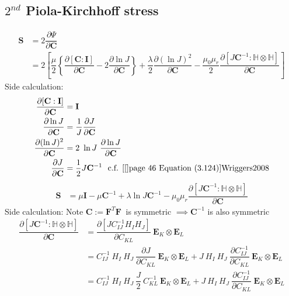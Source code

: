 \documentclass[11pt,a4paper,final]{article}
\begin{document}
\subsection{$2^{nd}$ Piola-Kirchhoff stress}
\begin{align*}
\mathbf{S} &= 2 \dfrac{\partial \Psi}{\partial \mathbf{C}} \\
&= 2 \left[ \dfrac{\mu}{2} \left\lbrace \dfrac{\partial [\mathbf{C} : \mathbf{I}]}{\partial \mathbf{C}} - 2 \dfrac{\partial \ln J}{\partial \mathbf{C}} \right\rbrace + \dfrac{\lambda}{2} \dfrac{\partial (\ln J)^2}{\partial \mathbf{C}} - \dfrac{\mu_0 \mu_r}{2} \dfrac{\partial [J \mathbf{C}^{-1} : \mathbb{H} \otimes \mathbb{H}]}{\partial \mathbf{C}} \right]
\end{align*}
Side calculation:
\begin{align*}
\dfrac{\partial [\mathbf{C} : \mathbf{I}]}{\partial \mathbf{C}} &= \mathbf{I} \\ 
\dfrac{\partial \ln J}{\partial \mathbf{C}} &= \dfrac{1}{J} \dfrac{\partial J}{\partial \mathbf{C}} \\
\dfrac{\partial (\ln J)^2}{\partial \mathbf{C}} &= 2 \ \ln J \ \dfrac{\partial \ln J}{\partial \mathbf{C}} \\
\dfrac{\partial J}{\partial \mathbf{C}} &= \dfrac{1}{2} J \mathbf{C}^{-1} \ \  \text{c.f. \cite[see][page 46 Equation (3.124)]{Wriggers2008}}
\end{align*}
\begin{align*}
\mathbf{S} &= \mu \mathbf{I} -  \mu \mathbf{C}^{-1} + \lambda \ln J \mathbf{C}^{-1} - \mu_0 \mu_r \dfrac{\partial [J \mathbf{C}^{-1} : \mathbb{H} \otimes \mathbb{H}]}{\partial \mathbf{C}}
\end{align*}
Side calculation: Note $\mathbf{C} := \mathbf{F}^T \mathbf{F} \ $ is symmetric $\implies \mathbf{C}^{-1}$ is also symmetric 
\begin{align*}
\dfrac{\partial [J \mathbf{C}^{-1} : \mathbb{H} \otimes \mathbb{H}]}{\partial \mathbf{C}} &= \dfrac{\partial [J C^{-1}_{IJ} H_I H_J]}{\partial C_{KL}} \ \mathbf{E}_K \otimes \mathbf{E}_L \\
&= C^{-1}_{IJ} \ H_I \ H_J \ \dfrac{\partial J}{\partial C_{KL}} \ \mathbf{E}_K \otimes \mathbf{E}_L + J \ H_I \ H_J \ \dfrac{\partial C^{-1}_{IJ}}{\partial C_{KL}} \ \mathbf{E}_K \otimes \mathbf{E}_L \\
&= C^{-1}_{IJ} \ H_I \ H_J \ \dfrac{J}{2} \ C^{-1}_{KL} \ \mathbf{E}_K \otimes \mathbf{E}_L + J \ H_I \ H_J \  \dfrac{\partial C^{-1}_{IJ}}{\partial C_{KL}} \ \mathbf{E}_K \otimes \mathbf{E}_L
\end{align*}
\end{document}
